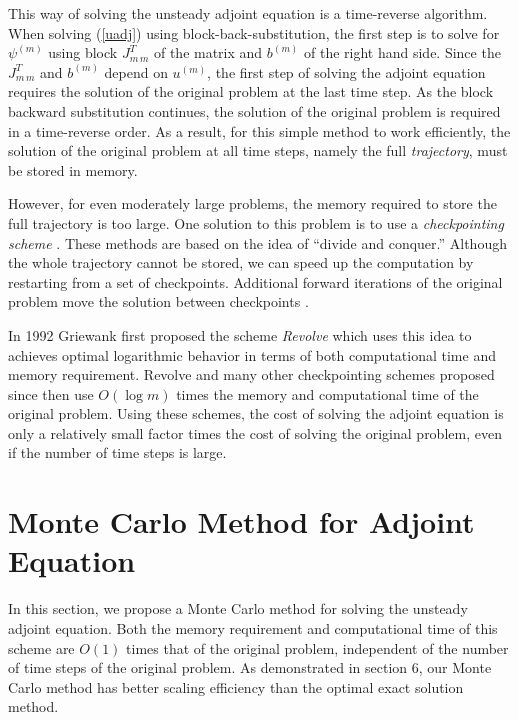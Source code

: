 \documentclass{elsart}
\theoremstyle{remark}
\theoremstyle{definition}
\theoremstyle{proof}
\begin{document}
    This way of solving the unsteady adjoint equation is a time-reverse
    algorithm.  When solving (\ref{uadj}) using block-back-substitution,
    the first step is to solve for $\psi^{(m)}$ using block $J_{m\,m}^T$
    of the matrix and $b^{(m)}$ of the right hand side.  Since the
    $J_{m\,m}^T$ and $b^{(m)}$ depend on $u^{(m)}$, the first step of
    solving the adjoint equation requires the solution of the original
    problem at the last time step.  As the block backward substitution
    continues, the solution of the original problem is required in a
    time-reverse order.  As a result, for this simple method to work
    efficiently, the solution of the original problem at all time steps,
    namely the full \emph{trajectory}, must be stored in memory.
    
    However, for even moderately large problems, the memory required to
    store the full trajectory is too large.  One solution to this problem
    is to use a \emph{checkpointing scheme} \cite{Griewank1992}
    \cite{Griewank2003} \cite{Griewank2004}.  These methods are based on the
    idea of ``divide and conquer.''  Although the whole trajectory cannot be
    stored,
    we can speed up the computation by restarting from a set of checkpoints.
    Additional forward iterations of the original problem move the solution
    between checkpoints \cite{Charpentier2001}.
    
    In 1992 Griewank \cite{Griewank1992} first proposed the scheme
    \emph{Revolve} which uses this idea to achieves optimal logarithmic
    behavior in terms of both computational time and memory requirement.
    Revolve and many other checkpointing schemes proposed since then use
    $O(\log m)$ times the memory and computational time of the original
    problem.  Using these schemes, the cost of solving the adjoint equation
    is only a relatively small factor times the cost of solving the original
    problem, even if the number of time steps is large.





\section{Monte Carlo Method for Adjoint Equation}
    In this section, we propose a Monte Carlo method for solving the unsteady
    adjoint equation.  Both the memory requirement and computational time of
    this scheme are $O(1)$ times that of the original problem, independent
    of the number of time steps of the original problem.  As demonstrated
    in section 6, our Monte Carlo method has better scaling efficiency than
    the optimal exact solution method.
    
\end{document}
